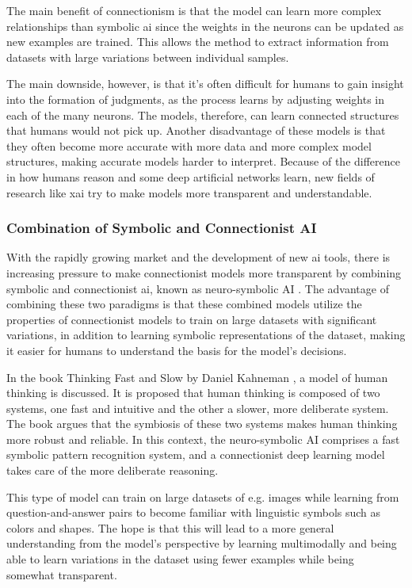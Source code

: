 The main benefit of connectionism is that the model can learn more complex relationships than symbolic \gls{ai} since the weights in the neurons can be updated as new examples are trained. This allows the method to extract information from datasets with large variations between individual samples.

The main downside, however, is that it's often difficult for humans to gain insight into the formation of judgments, as the process learns by adjusting weights in each of the many neurons. The models, therefore, can learn connected structures that humans would not pick up. Another disadvantage of these models is that they often become more accurate with more data and more complex model structures, making accurate models harder to interpret. Because of the difference in how humans reason and some deep artificial networks learn, new fields of research like \gls{xai} try to make models more transparent and understandable.


    \subsubsection{Combination of Symbolic and Connectionist AI}
    With the rapidly growing market and the development of new \gls{ai} tools, there is increasing pressure to make connectionist models more transparent by combining symbolic and connectionist \gls{ai}, known as neuro-symbolic AI \cite{valiantKnowledgeInfusionPursuit2008}. The advantage of combining these two paradigms is that these combined models utilize the properties of connectionist models to train on large datasets with significant variations, in addition to learning symbolic representations of the dataset, making it easier for humans to understand the basis for the model's decisions.

    In the book Thinking Fast and Slow by Daniel Kahneman \cite{kahnemanThinkingFastSlow2013}, a model of human thinking is discussed. It is proposed that human thinking is composed of two systems, one fast and intuitive and the other a slower, more deliberate system. The book argues that the symbiosis of these two systems makes human thinking more robust and reliable. In this context, the neuro-symbolic AI comprises a fast symbolic pattern recognition system, and a connectionist deep learning model takes care of the more deliberate reasoning.  
    
    This type of model can train on large datasets of e.g. images while learning from question-and-answer pairs to become familiar with linguistic symbols such as colors and shapes. The hope is that this will lead to a more general understanding from the model's perspective by learning multimodally and being able to learn variations in the dataset using fewer examples while being somewhat transparent.
    

